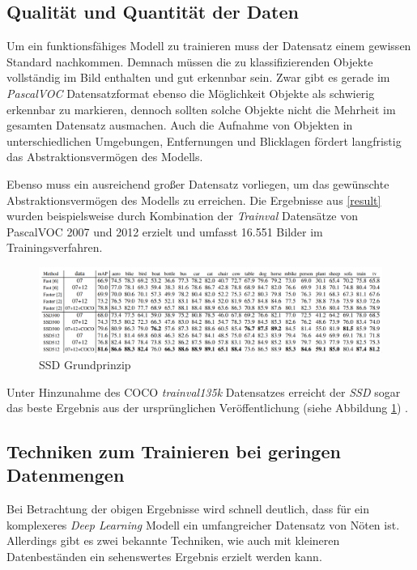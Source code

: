 \subsection{Qualität und Quantität der Daten}

Um ein funktionsfähiges Modell zu trainieren muss der Datensatz einem gewissen Standard nachkommen. Demnach müssen die zu klassifizierenden Objekte vollständig im Bild enthalten und gut erkennbar sein. Zwar gibt es gerade im \textit{PascalVOC} Datensatzformat ebenso die Möglichkeit Objekte als \glqq schwierig erkennbar\grqq{} zu markieren, dennoch sollten solche Objekte nicht die Mehrheit im gesamten Datensatz ausmachen. Auch die Aufnahme von Objekten in unterschiedlichen Umgebungen, Entfernungen und Blicklagen fördert langfristig das Abstraktionsvermögen des Modells. 

Ebenso muss ein ausreichend großer Datensatz vorliegen, um das gewünschte Abstraktionsvermögen des Modells zu erreichen. Die Ergebnisse aus \ref{result} wurden beispielsweise durch Kombination der \textit{Trainval} Datensätze von PascalVOC 2007 und 2012 erzielt und umfasst 16.551 Bilder im Trainingsverfahren. \cite{ssd.20161229} \cite{MarkEveringham.20070607} \cite{MarkEveringham.20120521}

\begin{figure}[ht]
	\begin{center}
		\includegraphics[width=15cm]{Bilder/ssd_results_details.png} 
		\caption[SSD Grundprinzip]{SSD Grundprinzip \cite{ssd.20161229}}
		\label{amountofdata}
	\end{center}
\end{figure}

Unter Hinzunahme des COCO \textit{trainval135k} Datensatzes erreicht der \textit{SSD} sogar das beste Ergebnis aus der ursprünglichen Veröffentlichung (siehe Abbildung \ref{amountofdata}) \cite{ssd.20161229}. 

\subsection{Techniken zum Trainieren bei geringen Datenmengen}

Bei Betrachtung der obigen Ergebnisse wird schnell deutlich, dass für ein komplexeres \textit{Deep Learning} Modell ein umfangreicher Datensatz von Nöten ist. Allerdings gibt es zwei bekannte Techniken, wie auch mit kleineren Datenbeständen ein sehenswertes Ergebnis erzielt werden kann. 

